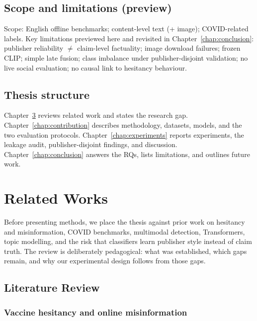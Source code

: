 \documentclass[12pt, a4paper]{report}
\begin{document}
\section{Scope and limitations (preview)}
\label{sec:scope-preview}

Scope: English offline benchmarks; content-level text (+ image); COVID-related labels.
Key limitations previewed here and revisited in Chapter~\ref{chap:conclusion}: publisher reliability $\neq$ claim-level factuality; image download failures; frozen CLIP; simple late fusion; class imbalance under publisher-disjoint validation; no live social evaluation; no causal link to hesitancy behaviour.

\section{Thesis structure}
\label{sec:plan}

Chapter~\ref{chap:related-works} reviews related work and states the research gap.
Chapter~\ref{chap:contribution} describes methodology, datasets, models, and the two evaluation protocols.
Chapter~\ref{chap:experiments} reports experiments, the leakage audit, publisher-disjoint findings, and discussion.
Chapter~\ref{chap:conclusion} answers the RQs, lists limitations, and outlines future work.


\chapter{Related Works}
\label{chap:related-works}

Before presenting methods, we place the thesis against prior work on hesitancy and misinformation, COVID benchmarks, multimodal detection, Transformers, topic modelling, and the risk that classifiers learn publisher style instead of claim truth.
The review is deliberately pedagogical: what was established, which gaps remain, and why our experimental design follows from those gaps.

\section{Literature Review}
\label{sec:literature-review}

\subsection{Vaccine hesitancy and online misinformation}
\end{document}
